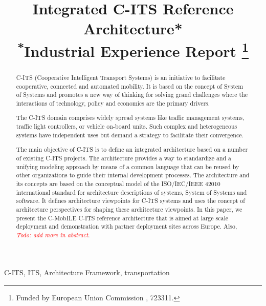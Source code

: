 \documentclass[conference]{IEEEtran}
\newcommand{\todo}[1]{\textcolor{red}{\emph{Todo: #1}}}
\begin{document}
\title{Integrated C-ITS Reference Architecture* \\
  {\footnotesize \textsuperscript{*}Industrial Experience Report}
  \thanks{Funded by European Union Commission , 723311.}
}

\author{
}

\maketitle


\begin{abstract}
C-ITS (Cooperative Intelligent Transport Systems) is an initiative to facilitate cooperative, connected and automated mobility.
It is based on the concept of System of Systems and promotes a new way of thinking for solving grand challenges where the interactions of technology, policy and economics are the primary drivers.

The C-ITS domain comprises widely spread systems like traffic management systems, traffic light controllers, or vehicle on-board units.
Such complex and heterogeneous systems have independent uses but demand a strategy to facilitate their convergence.

The main objective of C-ITS is to define an integrated architecture based on a number of existing C-ITS projects.
The architecture provides a way to standardize and a unifying modeling approach by means of a common language that can be reused by other organizations to guide their internal development processes.
The architecture and its concepts are based on the conceptual model of the ISO/IEC/IEEE 42010 \cite{iso42010} international standard for architecture descriptions of systems, System of Systems and software.
It defines architecture viewpoints for C-ITS systems and uses the concept of architecture perspectives for shaping these architecture viewpoints.
In this paper, we present the C-MobILE C-ITS reference architecture that is aimed at large scale deployment and demonstration with partner deployment sites across Europe. Also,  \todo{add more in abstract}.
\end{abstract}

\begin{IEEEkeywords}
C-ITS, ITS, Architecture Framework, transportation
\end{IEEEkeywords}
\end{document}
